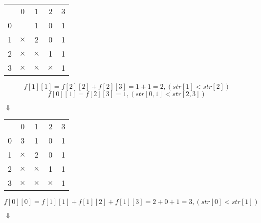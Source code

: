 \documentclass[a4paper,12pt]{article}
\begin{document}
\begin{center}
    \begin{tabular}{ r|c|c|c|c| }
        \multicolumn{1}{r}{} & \multicolumn{1}{c}{0} & \multicolumn{1}{c}{1} & \multicolumn{1}{c}{2} & \multicolumn{1}{c}{3}\\
        \cline{2-5}
        0 & \ & 1 & 0 & 1 \\
        \cline{2-5}
        1 & $\times$ & 2 & 0 & 1 \\
        \cline{2-5}
        2 & $\times$ & $\times$ & 1 & 1 \\
        \cline{2-5}
        3 & $\times$ & $\times$ & $\times$ & 1 \\
        \cline{2-5}
    \end{tabular}
\end{center}

\[
f[1][1] =  f[2][2] + f[2][3] = 1 + 1 = 2, (str[1] < str[2])
\]
\[
f[0][1] = f[2][3] = 1, (str[0,1] < str[2,3])
\]

\begin{center}
$\Downarrow$
\end{center}

\begin{center}
    \begin{tabular}{ r|c|c|c|c| }
        \multicolumn{1}{r}{} & \multicolumn{1}{c}{0} & \multicolumn{1}{c}{1} & \multicolumn{1}{c}{2} & \multicolumn{1}{c}{3}\\
        \cline{2-5}
        0 & 3 & 1 & 0 & 1 \\
        \cline{2-5}
        1 & $\times$ & 2 & 0 & 1 \\
        \cline{2-5}
        2 & $\times$ & $\times$ & 1 & 1 \\
        \cline{2-5}
        3 & $\times$ & $\times$ & $\times$ & 1 \\
        \cline{2-5}
    \end{tabular}
\end{center}

\[
f[0][0] = f[1][1] + f[1][2] + f[1][3] = 2 + 0 + 1 = 3, (str[0] < str[1])
\]

\begin{center}
$\Downarrow$
\end{center}
\end{document}
